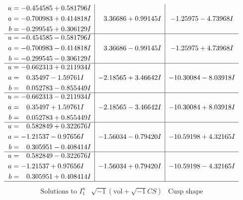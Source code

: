 \documentclass[1p]{elsarticle_modified}
\theoremstyle{definition}
\newcommand{\I}{\sqrt{-1}}
\begin{document}
$$\begin{array}{c|c|c}
\begin{aligned}
u &= -0.454585 + 0.581796 I \\
a &= -0.700983 + 0.414818 I \\
b &= -0.299545 + 0.306129 I\end{aligned}
 & \phantom{-}3.36686 + 0.99145 I & -1.25975 - 4.73968 I \\ \hline\begin{aligned}
u &= -0.454585 - 0.581796 I \\
a &= -0.700983 - 0.414818 I \\
b &= -0.299545 - 0.306129 I\end{aligned}
 & \phantom{-}3.36686 - 0.99145 I & -1.25975 + 4.73968 I \\ \hline\begin{aligned}
u &= -0.662313 + 0.211934 I \\
a &= \phantom{-}0.35497 - 1.59761 I \\
b &= \phantom{-}0.052783 - 0.855449 I\end{aligned}
 & -2.18565 + 3.46642 I & -10.30084 - 8.03918 I \\ \hline\begin{aligned}
u &= -0.662313 - 0.211934 I \\
a &= \phantom{-}0.35497 + 1.59761 I \\
b &= \phantom{-}0.052783 + 0.855449 I\end{aligned}
 & -2.18565 - 3.46642 I & -10.30084 + 8.03918 I \\ \hline\begin{aligned}
u &= \phantom{-}0.582849 + 0.322676 I \\
a &= -1.21537 - 0.97656 I \\
b &= \phantom{-}0.305951 - 0.408414 I\end{aligned}
 & -1.56034 - 0.79420 I & -10.59198 + 4.32165 I \\ \hline\begin{aligned}
u &= \phantom{-}0.582849 - 0.322676 I \\
a &= -1.21537 + 0.97656 I \\
b &= \phantom{-}0.305951 + 0.408414 I\end{aligned}
 & -1.56034 + 0.79420 I & -10.59198 - 4.32165 I\\
 \hline 
 \end{array}$$\newpage$$\begin{array}{c|c|c}  
\text{Solutions to }I^u_{1}& \I (\text{vol} + \sqrt{-1}CS) & \text{Cusp shape}\\
 \hline 
\begin{aligned}

\end{aligned}
\end{array}$$
\end{document}
